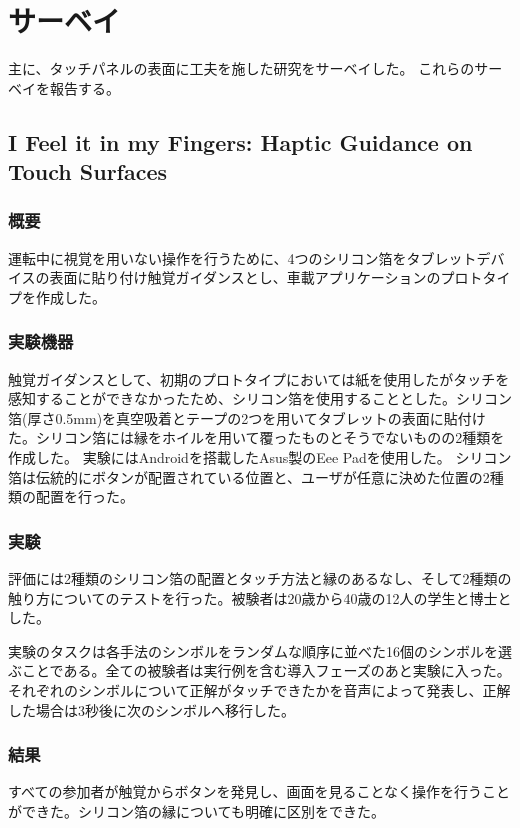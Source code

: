\documentclass[11pt,a4paper]{jarticle}
\begin{document}
\section{サーベイ}
主に、タッチパネルの表面に工夫を施した研究をサーベイした。
これらのサーベイを報告する。

\subsection{I Feel it in my Fingers: Haptic Guidance on Touch Surfaces\cite{Zimmermann:2014}}
\subsubsection{概要}
運転中に視覚を用いない操作を行うために、4つのシリコン箔をタブレットデバイスの表面に貼り付け触覚ガイダンスとし、車載アプリケーションのプロトタイプを作成した。

\subsubsection{実験機器}
触覚ガイダンスとして、初期のプロトタイプにおいては紙を使用したがタッチを感知することができなかったため、シリコン箔を使用することとした。シリコン箔(厚さ0.5mm)を真空吸着とテープの2つを用いてタブレットの表面に貼付けた。シリコン箔には縁をホイルを用いて覆ったものとそうでないものの2種類を作成した。
実験にはAndroidを搭載したAsus製のEee Padを使用した。
シリコン箔は伝統的にボタンが配置されている位置と、ユーザが任意に決めた位置の2種類の配置を行った。

\subsubsection{実験}
評価には2種類のシリコン箔の配置とタッチ方法と縁のあるなし、そして2種類の触り方についてのテストを行った。被験者は20歳から40歳の12人の学生と博士とした。

実験のタスクは各手法のシンボルをランダムな順序に並べた16個のシンボルを選ぶことである。全ての被験者は実行例を含む導入フェーズのあと実験に入った。それぞれのシンボルについて正解がタッチできたかを音声によって発表し、正解した場合は3秒後に次のシンボルへ移行した。

\subsubsection{結果}
すべての参加者が触覚からボタンを発見し、画面を見ることなく操作を行うことができた。シリコン箔の縁についても明確に区別をできた。
\end{document}
